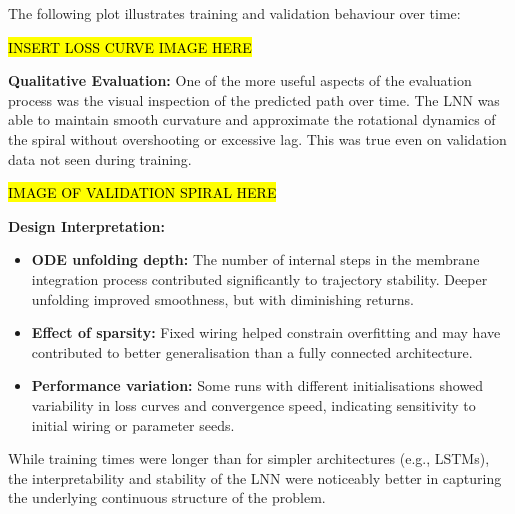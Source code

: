 \noindent The following plot illustrates training and validation behaviour over time:

\hl{INSERT LOSS CURVE IMAGE HERE}


\vspace{1em}
\noindent \textbf{Qualitative Evaluation:}  
One of the more useful aspects of the evaluation process was the visual inspection of the predicted path over time. The LNN was able to maintain smooth curvature and approximate the rotational dynamics of the spiral without overshooting or excessive lag. This was true even on validation data not seen during training.

\hl{IMAGE OF VALIDATION SPIRAL HERE}


\vspace{1em}
\noindent \textbf{Design Interpretation:}
\begin{itemize}
    \item \textbf{ODE unfolding depth:} The number of internal steps in the membrane integration process contributed significantly to trajectory stability. Deeper unfolding improved smoothness, but with diminishing returns.
    \item \textbf{Effect of sparsity:} Fixed wiring helped constrain overfitting and may have contributed to better generalisation than a fully connected architecture.
    \item \textbf{Performance variation:} Some runs with different initialisations showed variability in loss curves and convergence speed, indicating sensitivity to initial wiring or parameter seeds.
\end{itemize}

While training times were longer than for simpler architectures (e.g., LSTMs), the interpretability and stability of the LNN were noticeably better in capturing the underlying continuous structure of the problem.

